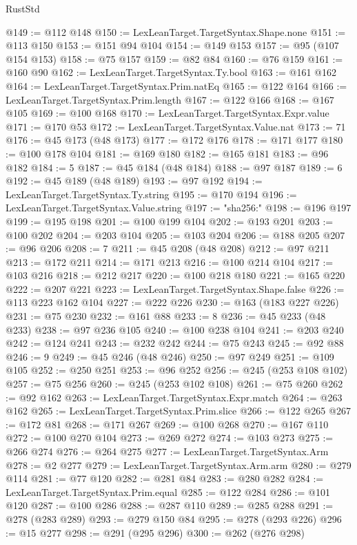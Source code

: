 \begin{lexlean}{RustStd}
\begin{coremodule}
@149 := @112 @148
@150 := LexLeanTarget.TargetSyntax.Shape.none
@151 := @113 @150
@153 := @151 @94 @104
@154 := @149 @153
@157 := @95 (@107 @154 @153)
@158 := @75 @157
@159 := @82 @84
@160 := @76 @159
@161 := @160 @90
@162 := LexLeanTarget.TargetSyntax.Ty.bool
@163 := @161 @162
@164 := LexLeanTarget.TargetSyntax.Prim.natEq
@165 := @122 @164
@166 := LexLeanTarget.TargetSyntax.Prim.length
@167 := @122 @166
@168 := @167 @105
@169 := @100 @168
@170 := LexLeanTarget.TargetSyntax.Expr.value
@171 := @170 @53
@172 := LexLeanTarget.TargetSyntax.Value.nat
@173 := 71
@176 := @45 @173 (@48 @173)
@177 := @172 @176
@178 := @171 @177
@180 := @100 @178 @104
@181 := @169 @180
@182 := @165 @181
@183 := @96 @182
@184 := 5
@187 := @45 @184 (@48 @184)
@188 := @97 @187
@189 := 6
@192 := @45 @189 (@48 @189)
@193 := @97 @192
@194 := LexLeanTarget.TargetSyntax.Ty.string
@195 := @170 @194
@196 := LexLeanTarget.TargetSyntax.Value.string
@197 := "sha256:"
@198 := @196 @197
@199 := @195 @198
@201 := @100 @199 @104
@202 := @193 @201
@203 := @100 @202
@204 := @203 @104
@205 := @103 @204
@206 := @188 @205
@207 := @96 @206
@208 := 7
@211 := @45 @208 (@48 @208)
@212 := @97 @211
@213 := @172 @211
@214 := @171 @213
@216 := @100 @214 @104
@217 := @103 @216
@218 := @212 @217
@220 := @100 @218 @180
@221 := @165 @220
@222 := @207 @221
@223 := LexLeanTarget.TargetSyntax.Shape.false
@226 := @113 @223 @162 @104
@227 := @222 @226
@230 := @163 (@183 @227 @226)
@231 := @75 @230
@232 := @161 @88
@233 := 8
@236 := @45 @233 (@48 @233)
@238 := @97 @236 @105
@240 := @100 @238 @104
@241 := @203 @240
@242 := @124 @241
@243 := @232 @242
@244 := @75 @243
@245 := @92 @88
@246 := 9
@249 := @45 @246 (@48 @246)
@250 := @97 @249
@251 := @109 @105
@252 := @250 @251
@253 := @96 @252
@256 := @245 (@253 @108 @102)
@257 := @75 @256
@260 := @245 (@253 @102 @108)
@261 := @75 @260
@262 := @92 @162
@263 := LexLeanTarget.TargetSyntax.Expr.match
@264 := @263 @162
@265 := LexLeanTarget.TargetSyntax.Prim.slice
@266 := @122 @265
@267 := @172 @81
@268 := @171 @267
@269 := @100 @268
@270 := @167 @110
@272 := @100 @270 @104
@273 := @269 @272
@274 := @103 @273
@275 := @266 @274
@276 := @264 @275
@277 := LexLeanTarget.TargetSyntax.Arm
@278 := @2 @277
@279 := LexLeanTarget.TargetSyntax.Arm.arm
@280 := @279 @114
@281 := @77 @120
@282 := @281 @84
@283 := @280 @282
@284 := LexLeanTarget.TargetSyntax.Prim.equal
@285 := @122 @284
@286 := @101 @120
@287 := @100 @286
@288 := @287 @110
@289 := @285 @288
@291 := @278 (@283 @289)
@293 := @279 @150 @84
@295 := @278 (@293 @226)
@296 := @15 @277
@298 := @291 (@295 @296)
@300 := @262 (@276 @298)

\end{coremodule}
\end{lexlean}
